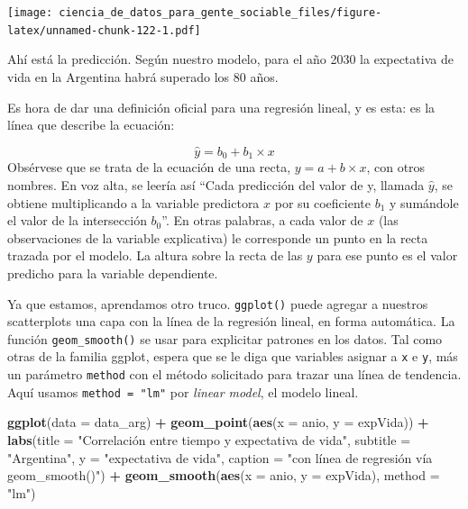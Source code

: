 \documentclass[spanish,]{book}
\newenvironment{Shaded}{\begin{snugshade}}{\end{snugshade}}
\newcommand{\DataTypeTok}[1]{\textcolor[rgb]{0.13,0.29,0.53}{#1}}
\newcommand{\KeywordTok}[1]{\textcolor[rgb]{0.13,0.29,0.53}{\textbf{#1}}}
\newcommand{\NormalTok}[1]{#1}
\newcommand{\OperatorTok}[1]{\textcolor[rgb]{0.81,0.36,0.00}{\textbf{#1}}}
\newcommand{\StringTok}[1]{\textcolor[rgb]{0.31,0.60,0.02}{#1}}
\begin{document}
\texttt{[image: ciencia\_de\_datos\_para\_gente\_sociable\_files/figure-latex/unnamed-chunk-122-1.pdf]}

Ahí está la predicción. Según nuestro modelo, para el año 2030 la expectativa de vida en la Argentina habrá superado los 80 años.

Es hora de dar una definición oficial para una regresión lineal, y es esta: es la línea que describe la ecuación:

\[ \hat{y} = b_0 + b_1 \times x \]
Obsérvese que se trata de la ecuación de una recta, \(y = a + b \times x\), con otros nombres. En voz alta, se leería así ``Cada predicción del valor de y, llamada \(\hat{y}\), se obtiene multiplicando a la variable predictora \(x\) por su coeficiente \(b_1\) y sumándole el valor de la intersección \(b_0\)''. En otras palabras, a cada valor de \(x\) (las observaciones de la variable explicativa) le corresponde un punto en la recta trazada por el modelo. La altura sobre la recta de las \(y\) para ese punto es el valor predicho para la variable dependiente.

Ya que estamos, aprendamos otro truco. \texttt{ggplot()} puede agregar a nuestros scatterplots una capa con la línea de la regresión lineal, en forma automática. La función \texttt{geom\_smooth()} se usar para explicitar patrones en los datos. Tal como otras de la familia ggplot, espera que se le diga que variables asignar a \texttt{x} e \texttt{y}, más un parámetro \texttt{method} con el método solicitado para trazar una línea de tendencia. Aquí usamos \texttt{method\ =\ "lm"} por \emph{linear model}, el modelo lineal.

\begin{Shaded}
\begin{Highlighting}[]
\KeywordTok{ggplot}\NormalTok{(}\DataTypeTok{data =}\NormalTok{ data_arg) }\OperatorTok{+}\StringTok{ }
\StringTok{    }\KeywordTok{geom_point}\NormalTok{(}\KeywordTok{aes}\NormalTok{(}\DataTypeTok{x =}\NormalTok{ anio, }\DataTypeTok{y =}\NormalTok{ expVida)) }\OperatorTok{+}
\StringTok{    }\KeywordTok{labs}\NormalTok{(}\DataTypeTok{title =} \StringTok{"Correlación entre tiempo y expectativa de vida"}\NormalTok{,}
         \DataTypeTok{subtitle =} \StringTok{"Argentina"}\NormalTok{,}
         \DataTypeTok{y =} \StringTok{"expectativa de vida"}\NormalTok{,}
         \DataTypeTok{caption =} \StringTok{"con línea de regresión vía geom_smooth()"}\NormalTok{) }\OperatorTok{+}
\StringTok{    }\KeywordTok{geom_smooth}\NormalTok{(}\KeywordTok{aes}\NormalTok{(}\DataTypeTok{x =}\NormalTok{ anio, }\DataTypeTok{y =}\NormalTok{ expVida), }\DataTypeTok{method =} \StringTok{"lm"}\NormalTok{)}
\end{Highlighting}
\end{Shaded}
\end{document}
